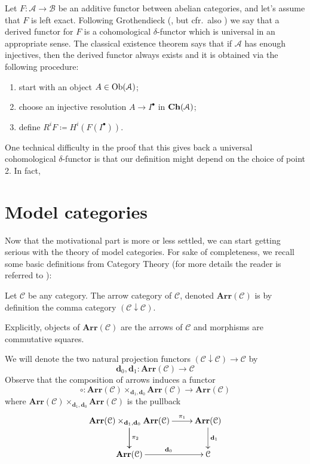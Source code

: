 \begin{refsection}
Let $F \colon \mathcal A \to \mathcal B$ be an additive functor between abelian categories, and let's assume that $F$ is left exact. Following Grothendieck (\cite{grothendieck-sur-quelques-points}, but cfr.\ also \cite[Ch. II]{weibel}) we say that a derived functor for $F$ is a cohomological $\delta$-functor which is universal in an appropriate sense. The classical existence theorem says that if $\mathcal A$ has enough injectives, then the derived functor always exists and it is obtained via the following procedure:
\begin{enumerate}
\item start with an object $A \in \operatorname{Ob}(\mathcal A)$;
\item choose an injective resolution $A \to I^\bullet$ in $\mathbf{Ch}(\mathcal A)$;
\item define $R^i F\coloneqq H^i(F(I^\bullet))$.
\end{enumerate}
One technical difficulty in the proof that this gives back a universal cohomological $\delta$-functor is that our definition might depend on the choice of point 2. In fact, 

\section{Model categories}

Now that the motivational part is more or less settled, we can start getting serious with the theory of model categories. For sake of completeness, we recall some basic definitions from Category Theory (for more details the reader is referred to \cite{cwm}):

\begin{defin}
Let $\mathcal C$ be any category. The arrow category of $\mathcal C$, denoted $\mathbf{Arr}(\mathcal C)$ is by definition the comma category $(\mathcal C \downarrow \mathcal C)$.
\end{defin}

\begin{rmk}
Explicitly, objects of $\mathbf{Arr}(\mathcal C)$ are the arrows of $\mathcal C$ and morphisms are commutative squares.
\end{rmk}

\begin{rmk}
We will denote the two natural projection functors $(\mathcal C \downarrow \mathcal C) \to \mathcal C$ by
\[
\mathbf d_0, \mathbf d_1 \colon \mathbf{Arr}(\mathcal C) \to \mathcal C
\]
Observe that the composition of arrows induces a functor
\[
\circ \colon \mathbf{Arr}(\mathcal C) \times_{\mathbf d_1, \mathbf d_0} \mathbf{Arr}(\mathcal C) \to \mathbf{Arr}(\mathcal C)
\]
where $\mathbf{Arr}(\mathcal C) \times_{\mathbf d_1, \mathbf d_0} \mathbf{Arr}(\mathcal C)$ is the pullback
\[
\xymatrix{
\mathbf{Arr}(\mathcal C) \times_{\mathbf d_1, \mathbf d_0} \mathbf{Arr}(\mathcal C) \ar[d] \ar[r]^-{\pi_1} \ar[d]^{\pi_2} & \mathbf{Arr}(\mathcal C) \ar[d]^{\mathbf d_1} \\ \mathbf{Arr}(\mathcal C) \ar[r]^{\mathbf d_0} & \mathcal C
}
\]
\end{rmk}


\end{refsection}
